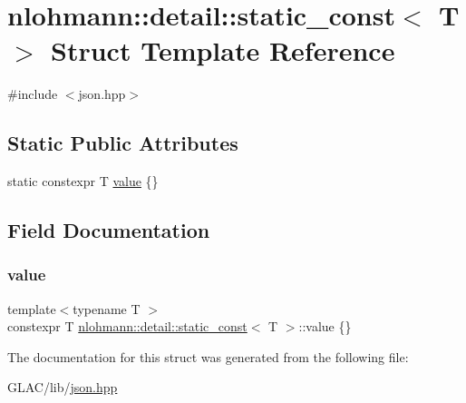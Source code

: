 \hypertarget{structnlohmann_1_1detail_1_1static__const}{}\section{nlohmann\+::detail\+::static\+\_\+const$<$ T $>$ Struct Template Reference}
\label{structnlohmann_1_1detail_1_1static__const}


{\ttfamily \#include $<$json.\+hpp$>$}

\subsection*{Static Public Attributes}
\begin{DoxyCompactItemize}
\item 
static constexpr T \mbox{\hyperlink{structnlohmann_1_1detail_1_1static__const_a6bb7ab2ddd6abc41fb4ffb7c6dfa237e}{value}} \{\}
\end{DoxyCompactItemize}


\subsection{Field Documentation}
\mbox{\label{structnlohmann_1_1detail_1_1static__const_a6bb7ab2ddd6abc41fb4ffb7c6dfa237e}} 
\subsubsection{\texorpdfstring{value}{value}}
{\footnotesize\ttfamily template$<$typename T $>$ \\
constexpr T \mbox{\hyperlink{structnlohmann_1_1detail_1_1static__const}{nlohmann\+::detail\+::static\+\_\+const}}$<$ T $>$\+::value \{\}\hspace{0.3cm}{\ttfamily [static]}}



The documentation for this struct was generated from the following file\+:\begin{DoxyCompactItemize}
\item 
G\+L\+A\+C/lib/\mbox{\hyperlink{json_8hpp}{json.\+hpp}}\end{DoxyCompactItemize}

